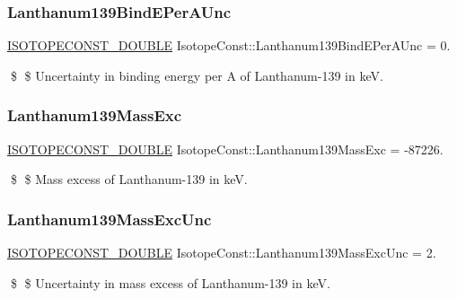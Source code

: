 \subsubsection{\texorpdfstring{Lanthanum139\+Bind\+E\+Per\+A\+Unc}{Lanthanum139BindEPerAUnc}}
{\footnotesize\ttfamily \mbox{\hyperlink{group___isotope_const-_macros_ga8f45a7272ce02c0b4c65c44636ed719a}{I\+S\+O\+T\+O\+P\+E\+C\+O\+N\+S\+T\+\_\+\+D\+O\+U\+B\+LE}} Isotope\+Const\+::\+Lanthanum139\+Bind\+E\+Per\+A\+Unc = 0.}

\$ \$ Uncertainty in binding energy per A of Lanthanum-\/139 in keV. \mbox{\label{group___isotope_const-_lanthanum-_la139_ga42361556f25e53bc741b65166a6eaea3}} 
\subsubsection{\texorpdfstring{Lanthanum139\+Mass\+Exc}{Lanthanum139MassExc}}
{\footnotesize\ttfamily \mbox{\hyperlink{group___isotope_const-_macros_ga8f45a7272ce02c0b4c65c44636ed719a}{I\+S\+O\+T\+O\+P\+E\+C\+O\+N\+S\+T\+\_\+\+D\+O\+U\+B\+LE}} Isotope\+Const\+::\+Lanthanum139\+Mass\+Exc = -\/87226.}

\$ \$ Mass excess of Lanthanum-\/139 in keV. \mbox{\label{group___isotope_const-_lanthanum-_la139_gab1a74902918a8ce62e0b8b7168eb7bc7}} 
\subsubsection{\texorpdfstring{Lanthanum139\+Mass\+Exc\+Unc}{Lanthanum139MassExcUnc}}
{\footnotesize\ttfamily \mbox{\hyperlink{group___isotope_const-_macros_ga8f45a7272ce02c0b4c65c44636ed719a}{I\+S\+O\+T\+O\+P\+E\+C\+O\+N\+S\+T\+\_\+\+D\+O\+U\+B\+LE}} Isotope\+Const\+::\+Lanthanum139\+Mass\+Exc\+Unc = 2.}

\$ \$ Uncertainty in mass excess of Lanthanum-\/139 in keV. \mbox{\label{group___isotope_const-_lanthanum-_la139_ga2ca9bc791b80033657c8dae325e41e0b}} 
